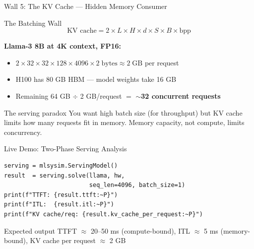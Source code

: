 \documentclass[aspectratio=169, 12pt]{beamer}
\newcommand{\wallbox}[2]{%
  \begin{block}{#1}#2\end{block}%
}
\begin{document}
\begin{frame}{Wall 5: The KV Cache --- Hidden Memory Consumer}

\small
\wallbox{The Batching Wall}{
\[
  \text{KV cache} = 2 \times L \times H \times d \times S \times B \times \text{bpp}
\]
}

\vspace{0.2cm}
\textbf{Llama-3 8B at 4K context, FP16:}
\begin{itemize}
  \item $2 \times 32 \times 32 \times 128 \times 4096 \times 2\;\text{bytes} \approx 2\;\text{GB}$ per request
  \item H100 has 80 GB HBM --- model weights take 16 GB
  \item Remaining 64 GB $\div$ 2 GB/request $=$ \textbf{$\sim$32 concurrent requests}
\end{itemize}

\vspace{0.2cm}
\begin{alertblock}{The serving paradox}
  You want high batch size (for throughput) but KV cache limits how
  many requests fit in memory. \alert{Memory capacity, not compute, limits concurrency.}
\end{alertblock}
\end{frame}

\begin{frame}[fragile]{Live Demo: Two-Phase Serving Analysis}

\small
\begin{lstlisting}
serving = mlsysim.ServingModel()
result  = serving.solve(llama, hw,
                        seq_len=4096, batch_size=1)
print(f"TTFT: {result.ttft:~P}")
print(f"ITL:  {result.itl:~P}")
print(f"KV cache/req: {result.kv_cache_per_request:~P}")
\end{lstlisting}

\vspace{0.2cm}
\begin{exampleblock}{Expected output}
  TTFT $\approx$ 20--50 ms (compute-bound),
  ITL $\approx$ 5 ms (memory-bound),
  KV cache per request $\approx$ 2 GB
\end{exampleblock}
\end{frame}
\end{document}
